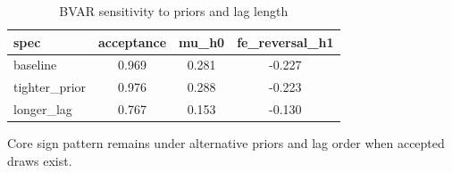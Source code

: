 \begin{table}[!htbp]
\centering
\caption{BVAR sensitivity to priors and lag length}
\label{tab:bvar_sensitivity}
\begin{threeparttable}
\begin{tabular}{lccc}
\toprule
spec & acceptance & mu\_h0 & fe\_reversal\_h1 \\
\midrule
baseline & 0.969 & 0.281 & -0.227 \\
tighter\_prior & 0.976 & 0.288 & -0.223 \\
longer\_lag & 0.767 & 0.153 & -0.130 \\
\bottomrule
\end{tabular}
\begin{tablenotes}[flushleft]
\footnotesize
\item Core sign pattern remains under alternative priors and lag order when accepted draws exist.
\end{tablenotes}
\end{threeparttable}
\end{table}
